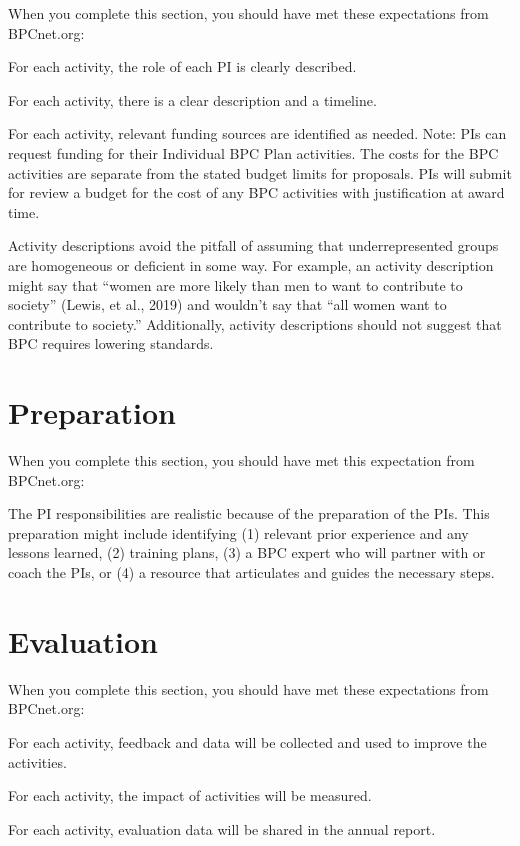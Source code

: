 \documentclass{proposalnsf}
\begin{document}
\color{Turquoise}
When you complete this section, you should have met these expectations from BPCnet.org: 
\begin{rubricitem}
    \item For each activity, the role of each PI is clearly described. 
    \item For each activity, there is a clear description and a timeline. \item For each activity, relevant funding sources are identified as needed. Note: PIs can request funding for their Individual BPC Plan activities. The costs for the BPC activities are separate from the stated budget limits for proposals. PIs will submit for review a budget for the cost of any BPC activities with justification at award time. 
    \item Activity descriptions avoid the pitfall of assuming that underrepresented groups are homogeneous or deficient in some way. For example, an activity description might say that “women are more likely than men to want to contribute to society” (Lewis, et al., 2019)  and wouldn’t say that “all women want to contribute to society.” Additionally, activity descriptions should not suggest that BPC requires lowering standards.  
\end{rubricitem}

\color{Black}
\section{Preparation}

\color{Turquoise}
When you complete this section, you should have met this expectation from BPCnet.org: 
\begin{rubricitem}
    \item The PI responsibilities are realistic because of the preparation of the PIs. This preparation might include identifying (1) relevant prior experience and any lessons learned, (2) training plans, (3) a BPC expert who will partner with or coach the PIs, or (4) a resource that articulates and guides the necessary steps.
\end{rubricitem}


\color{black}
\section{Evaluation}

\color{Turquoise}
When you complete this section, you should have met these expectations from BPCnet.org: 
\begin{rubricitem}
    \item For each activity, feedback and data will be collected and used to improve the activities. 
    \item For each activity, the impact of activities will be measured.
    \item For each activity, evaluation data will be shared in the annual report. 
\end{rubricitem}
    




\end{document}
